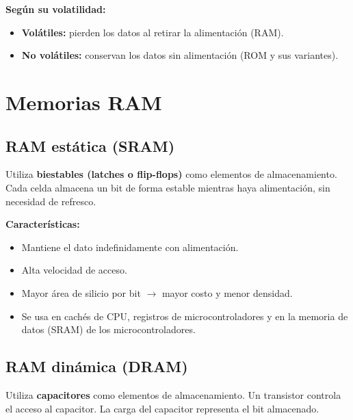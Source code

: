\textbf{Según su volatilidad:}
\begin{itemize}
  \item \textbf{Volátiles:} pierden los datos al retirar la alimentación (RAM).
  \item \textbf{No volátiles:} conservan los datos sin alimentación (ROM y sus variantes).
\end{itemize}


\section{Memorias RAM}

\subsection{RAM estática (SRAM)}

Utiliza \textbf{biestables (latches o flip-flops)} como elementos de almacenamiento. Cada celda almacena un bit de forma estable mientras haya alimentación, sin necesidad de refresco.


\textbf{Características:}
\begin{itemize}
  \item Mantiene el dato indefinidamente con alimentación.
  \item Alta velocidad de acceso.
  \item Mayor área de silicio por bit $\rightarrow$ mayor costo y menor densidad.
  \item Se usa en cachés de CPU, registros de microcontroladores y en la memoria de datos (SRAM) de los microcontroladores.
\end{itemize}

\subsection{RAM dinámica (DRAM)}

Utiliza \textbf{capacitores} como elementos de almacenamiento. Un transistor controla el acceso al capacitor. La carga del capacitor representa el bit almacenado.


